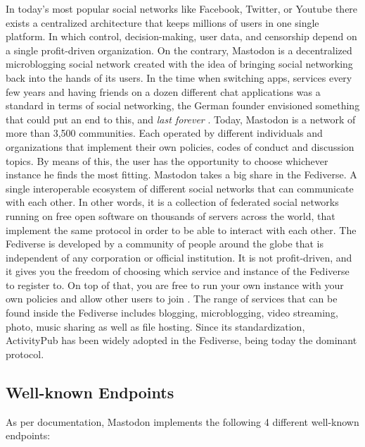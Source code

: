 In today's most popular social networks like Facebook, Twitter, or Youtube there exists a centralized architecture that keeps millions of users in one single platform. In which control, decision-making, user data, and censorship depend on a single profit-driven organization. On the contrary, Mastodon is a decentralized microblogging social network created with the idea of bringing social networking back into the hands of its users. In the time when switching apps, services every few years and having friends on a dozen different chat applications was a standard in terms of social networking, the German founder envisioned something that could put an end to this, and \emph{last forever} \cite{tilley_2018}. Today, Mastodon is a network of more than 3,500 communities. Each operated by different individuals and organizations that implement their own policies, codes of conduct and discussion topics. By means of this,  the user has the opportunity to choose whichever instance he finds the most fitting.
Mastodon takes a big share in the Fediverse. A single interoperable ecosystem of different social networks that can communicate with each other. In other words, it is a collection of federated social networks running on free open software on thousands of servers across the world, that implement the same protocol in order to be able to interact with each other. The Fediverse is developed by a community of people around the globe that is independent of any corporation or official institution. It is not profit-driven, and it gives you the freedom of choosing which service and instance of the Fediverse to register to. On top of that, you are free to run your own instance with your own policies and allow other users to join \cite{holloway_2018}. The range of services that can be found inside the Fediverse includes blogging, microblogging, video streaming, photo, music sharing as well as file hosting. Since its standardization, ActivityPub has been widely adopted in the Fediverse, being today the dominant protocol.

\subsection{Well-known Endpoints}

\cite{nottingham_2019}
As per documentation, Mastodon implements the following 4 different well-known endpoints: 


